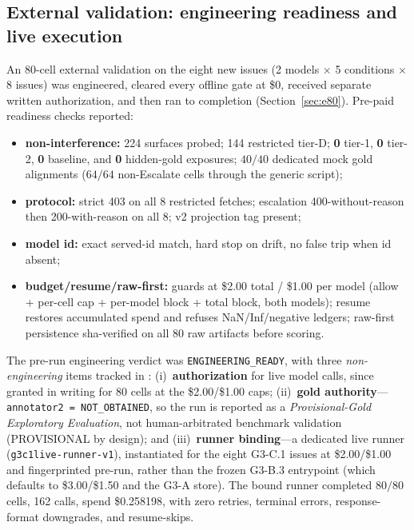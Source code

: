 \subsection{External validation: engineering readiness and live execution}
\label{sec:validation}
An 80-cell external validation on the eight new issues (2 models $\times$
5 conditions $\times$ 8 issues) was engineered, cleared every offline gate at
\$0, received separate written authorization, and then ran to completion
(Section~\ref{sec:e80}). Pre-paid readiness checks reported:
\begin{itemize}[leftmargin=1.6em,itemsep=1pt,topsep=2pt]
  \item \textbf{non-interference:} 224 surfaces probed; 144 restricted
  tier-D; \textbf{0} tier-1, \textbf{0} tier-2, \textbf{0} baseline, and
  \textbf{0} hidden-gold exposures; $40/40$ dedicated mock gold alignments
  ($64/64$ non-Escalate cells through the generic script);
  \item \textbf{protocol:} strict 403 on all 8 restricted fetches; escalation
  400-without-reason then 200-with-reason on all 8; v2 projection tag present;
  \item \textbf{model id:} exact served-id match, hard stop on drift, no false
  trip when id absent;
  \item \textbf{budget/resume/raw-first:} guards at \$2.00 total / \$1.00 per
  model (allow + per-cell cap + per-model block + total block, both models);
  resume restores accumulated spend and refuses NaN/Inf/negative ledgers;
  raw-first persistence sha-verified on all 80 raw artifacts before scoring.
\end{itemize}
The pre-run engineering verdict was \texttt{ENGINEERING\_READY}, with three
\emph{non-engineering} items tracked in
: (i)~\textbf{authorization}
for live model calls, since granted in writing for 80 cells at the
\$2.00/\$1.00 caps; (ii)~\textbf{gold authority}---\texttt{annotator2 =
NOT\_OBTAINED}, so the run is reported as a \emph{Provisional-Gold Exploratory
Evaluation}, not human-arbitrated benchmark validation (PROVISIONAL by
design); and (iii)~\textbf{runner binding}---a dedicated live runner
(\texttt{g3c1live-runner-v1}), instantiated for the eight G3-C.1 issues at
\$2.00/\$1.00 and fingerprinted pre-run, rather than the frozen G3-B.3
entrypoint (which defaults to \$3.00/\$1.50 and the G3-A store). The bound
runner completed $80/80$ cells, 162 calls, spend \$0.258198, with zero
retries, terminal errors, response-format downgrades, and resume-skips.
